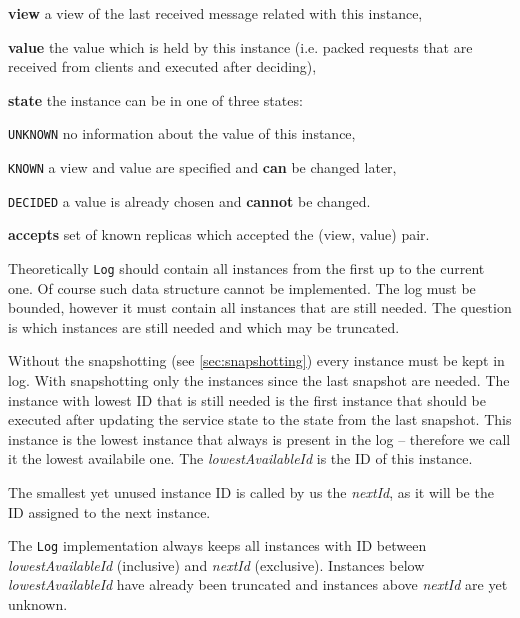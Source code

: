 \begin{tightList}[\setlength{\itemindent}{0pt}\setlength{\leftmargin}{2\leftmargin}]
  \item[\textbf{view}] a view of the last received message related with this instance,
  \item[\textbf{value}] the value which is held by this instance (i.e. packed requests that are received from clients and executed after deciding), %
  \item[\textbf{state}] the instance can be in one of three states:
  \begin{tightList}[\setlength{\itemindent}{0pt} \setlength{\labelwidth}{7em}]
    \item[\texttt{\tiny UNKNOWN}] no information about the value of this instance,
    \item[\texttt{\tiny KNOWN}] a view and value are specified and \textbf{can} be changed later,
    \item[\texttt{\tiny DECIDED}] a value is already chosen and \textbf{cannot} be changed.
  \end{tightList}
  \item[\textbf{accepts}] set of known replicas which accepted the (view, value) pair.
\end{tightList}

Theoretically \texttt{Log} should contain all instances from the first up to the current one.
Of course such data structure cannot be implemented. The log must be bounded, however it must contain all instances that are still needed. The question is which instances are still needed and which may be truncated.

Without the snapshotting (see \ref{sec:snapshotting}) every instance must be kept in log. With snapshotting only the instances since the last snapshot are needed. The instance with lowest ID that is still needed is the first instance that should be executed after updating the service state to the state from the last snapshot. This instance is the lowest instance that always is present in the log -- therefore we call it the lowest availabile one. The \textit{lowestAvailableId} is the ID of this instance.

The smallest yet unused instance ID is called by us the \textit{nextId}, as it will be the ID assigned to the next instance.

The \texttt{Log} implementation always keeps all instances with ID between \textit{lowestAvailableId} (inclusive) and \textit{nextId} (exclusive). Instances below \textit{lowestAvailableId} have already been truncated and instances above \textit{nextId} are yet unknown.

